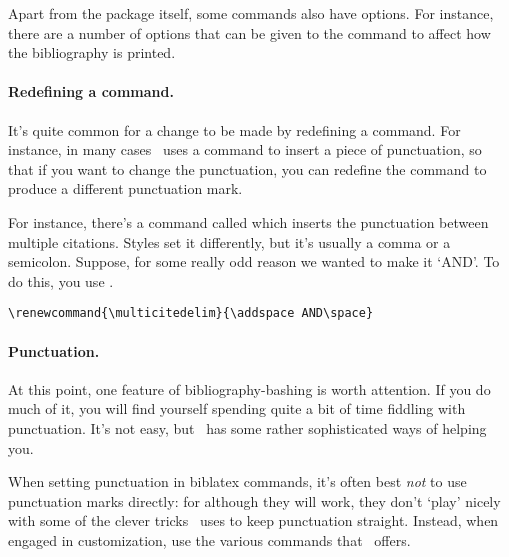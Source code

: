 Apart from the package itself, some commands also have options. For
instance, there are a number of options that can be given to the
command to affect how the bibliography is printed.

\paragraph{Redefining a command.} It's quite common for a change to be
made by redefining a command. For instance, in many cases \biblatex\
uses a command to insert a piece of punctuation, so that if you want
to change the punctuation,\intref{See p~\pageref{sec:punctuation}.}
you can redefine the command to produce a different punctuation mark.

For instance, there's a command called  which
inserts the punctuation between multiple citations. Styles set it
differently, but it's usually a comma or a semicolon. Suppose, for
some really odd reason we wanted to make it `AND'. To do this, you use
\cs{renewcommand}.
\begin{verbatim}
\renewcommand{\multicitedelim}{\addspace AND\space}
\end{verbatim}

\paragraph{Punctuation.} At this point, one feature of
bibliography-bashing is worth attention. If you do much of it, you
will find yourself spending quite a bit of time fiddling with
punctuation. It's not easy, but \biblatex\ has some rather
sophisticated ways of helping you.

When setting punctuation in biblatex commands, it's often best
\emph{not} to use punctuation marks directly: for although they will
work, they don't `play' nicely with some of the clever tricks
\biblatex\ uses to keep punctuation straight. Instead, when engaged in
customization, use the various commands that \biblatex\ offers.

